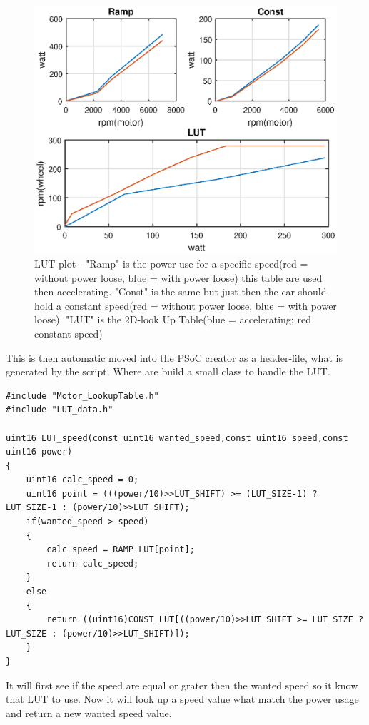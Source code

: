 \begin{figure}[H]
	\centering
	\includegraphics [width=6in]{Software/Pictures/LUT.eps}
	\caption{LUT plot - "Ramp" is the power use for a specific speed(red = without power loose, blue = with power loose) this table are used then accelerating. "Const" is the same but just then the car should hold a constant speed(red = without power loose, blue = with power loose). "LUT" is the 2D-look Up Table(blue = accelerating; red constant speed)}
	\label{fig:LUT_plot}
\end{figure}

This is then automatic moved into the PSoC creator as a header-file, what is generated by the script. Where are build a small class to handle the LUT.

\lstset{language=C}
\begin{lstlisting}
#include "Motor_LookupTable.h"
#include "LUT_data.h"

uint16 LUT_speed(const uint16 wanted_speed,const uint16 speed,const uint16 power)
{
	uint16 calc_speed = 0;
	uint16 point = (((power/10)>>LUT_SHIFT) >= (LUT_SIZE-1) ? LUT_SIZE-1 : (power/10)>>LUT_SHIFT);
	if(wanted_speed > speed)
	{
		calc_speed = RAMP_LUT[point];
		return calc_speed;
	}
	else
	{
		return ((uint16)CONST_LUT[((power/10)>>LUT_SHIFT >= LUT_SIZE ? LUT_SIZE : (power/10)>>LUT_SHIFT)]);
	}
}
\end{lstlisting}

It will first see if the speed are equal or grater then the wanted speed so it know that LUT to use. Now it will look up a speed value what match the power usage and return a new wanted speed value.



